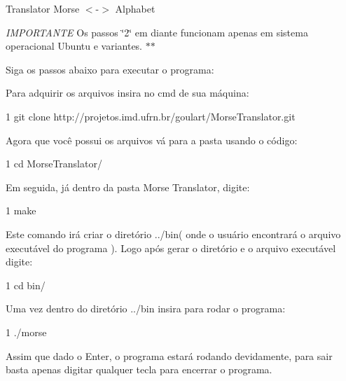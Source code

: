 Translator Morse $<$-\/$>$ Alphabet

{\itshape I\+M\+P\+O\+R\+T\+A\+N\+TE} Os passos \char`\"{}2\char`\"{} em diante funcionam apenas em sistema operacional Ubuntu e variantes. $\ast$$\ast$

Siga os passos abaixo para executar o programa\+:


\begin{DoxyEnumerate}
\item Para adquirir os arquivos insira no cmd de sua máquina\+:
\end{DoxyEnumerate}


\begin{DoxyCode}
1 git clone http://projetos.imd.ufrn.br/goulart/MorseTranslator.git
\end{DoxyCode}



\begin{DoxyEnumerate}
\item Agora que você possui os arquivos vá para a pasta usando o código\+:
\end{DoxyEnumerate}


\begin{DoxyCode}
1 cd MorseTranslator/
\end{DoxyCode}



\begin{DoxyEnumerate}
\item Em seguida, já dentro da pasta Morse Translator, digite\+:
\end{DoxyEnumerate}


\begin{DoxyCode}
1 make
\end{DoxyCode}



\begin{DoxyEnumerate}
\item Este comando irá criar o diretório ../bin( onde o usuário encontrará o arquivo executável do programa ). Logo após gerar o diretório e o arquivo executável digite\+:
\end{DoxyEnumerate}


\begin{DoxyCode}
1 cd bin/
\end{DoxyCode}



\begin{DoxyEnumerate}
\item Uma vez dentro do diretório ../bin insira para rodar o programa\+:
\end{DoxyEnumerate}


\begin{DoxyCode}
1 ./morse
\end{DoxyCode}


Assim que dado o Enter, o programa estará rodando devidamente, para sair basta apenas digitar qualquer tecla para encerrar o programa. 